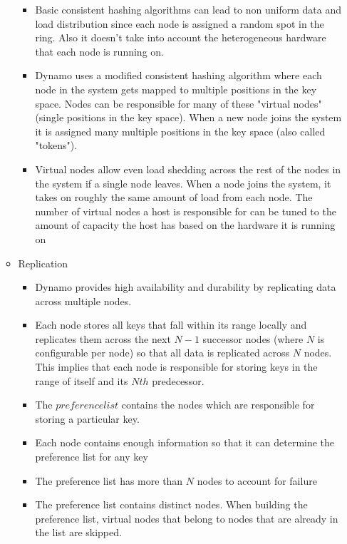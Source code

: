 \documentclass[a4paper]{article}
\begin{document}
\begin{itemize}
\begin{itemize}
\begin{itemize}
\item Basic consistent hashing algorithms can lead to non uniform data and load distribution since each node is assigned a random spot in the ring. Also it doesn't take into account the heterogeneous hardware that each node is running on.

\item Dynamo uses a modified consistent hashing algorithm where each node in the system gets mapped to multiple positions in the key space. Nodes can be responsible for many of these "virtual nodes" (single positions in the key space). When a new node joins the system it is assigned many multiple positions in the key space (also called "tokens").

\item Virtual nodes allow even load shedding across the rest of the nodes in the system if a single node leaves. When a node joins the system, it takes on roughly the same amount of load from each node. The number of virtual nodes a host is responsible for can be tuned to the amount of capacity the host has based on the hardware it is running on
\end{itemize}

\item Replication
\begin{itemize}
\item Dynamo provides high availability and durability by replicating data across multiple nodes.

\item Each node stores all keys that fall within its range locally and replicates them across the next $N-1$ successor nodes (where $N$ is configurable per node) so that all data is replicated across $N$ nodes. This implies that each node is responsible for storing keys in the range of itself and its $Nth$ predecessor.

\item The $preference list$ contains the nodes which are responsible for storing a particular key.

\item Each node contains enough information so that it can determine the preference list for any key

\item The preference list has more than $N$ nodes to account for failure

\item The preference list contains distinct nodes. When building the preference list, virtual nodes that belong to nodes that are already in the list are skipped. 
\end{itemize}


\end{itemize}
\end{itemize}
\end{document}

